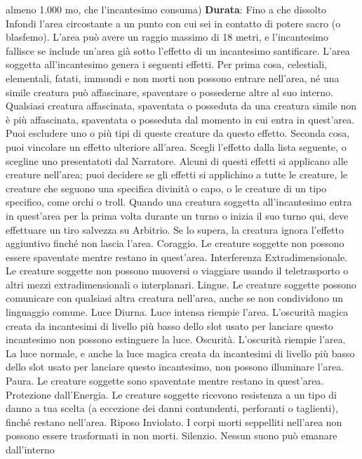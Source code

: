 \begin{multicols}{2}
almeno 1.000 mo, che l’incantesimo consuma)
\textbf{Durata}: Fino a che dissolto
Infondi l’area circostante a un punto con cui sei in
contatto di potere sacro (o blasfemo). L’area può avere
un raggio massimo di 18 metri, e l’incantesimo fallisce
se include un’area già sotto l’effetto di un incantesimo
santificare. L’area soggetta all’incantesimo genera i
seguenti effetti.
Per prima cosa, celestiali, elementali, fatati, immondi e
non morti non possono entrare nell’area, né una simile
creatura può affascinare, spaventare o possederne
altre al suo interno. Qualsiasi creatura affascinata,
spaventata o posseduta da una creatura simile non è
più affascinata, spaventata o posseduta dal momento in
cui entra in quest’area. Puoi escludere uno o più tipi di
queste creature da questo effetto.
Seconda cosa, puoi vincolare un effetto ulteriore
all’area. Scegli l’effetto dalla lista seguente, o scegline
uno presentatoti dal Narratore. Alcuni di questi effetti si
applicano alle creature nell’area; puoi decidere se gli
effetti si applichino a tutte le creature, le creature che
seguono una specifica divinità o capo, o le creature di
un tipo specifico, come orchi o troll. Quando una
creatura soggetta all’incantesimo entra in quest’area
per la prima volta durante un turno o inizia il suo turno
qui, deve effettuare un tiro salvezza su Arbitrio. Se lo
supera, la creatura ignora l’effetto aggiuntivo finché non
lascia l’area.
Coraggio. Le creature soggette non possono essere
spaventate mentre restano in quest’area.
Interferenza Extradimensionale. Le creature soggette
non possono muoversi o viaggiare usando il
teletrasporto o altri mezzi extradimensionali o
interplanari.
Lingue. Le creature soggette possono comunicare con
qualsiasi altra creatura nell’area, anche se non
condividono un linguaggio comune.
Luce Diurna. Luce intensa riempie l’area. L’oscurità
magica creata da incantesimi di livello più basso dello
slot usato per lanciare questo incantesimo non possono
estinguere la luce.
Oscurità. L’oscurità riempie l’area. La luce normale, e
anche la luce magica creata da incantesimi di livello più
basso dello slot usato per lanciare questo incantesimo,
non possono illuminare l’area.
Paura. Le creature soggette sono spaventate mentre
restano in quest’area.
Protezione dall’Energia. Le creature soggette
ricevono resistenza a un tipo di danno a tua scelta (a
eccezione dei danni contundenti, perforanti o taglienti),
finché restano nell’area.
Riposo Inviolato. I corpi morti seppelliti nell’area non
possono essere trasformati in non morti.
Silenzio. Nessun suono può emanare dall’interno

\end{multicols}
